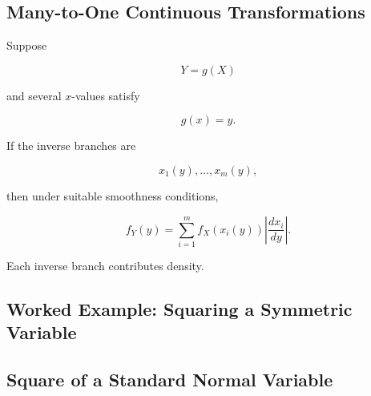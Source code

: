 \subsection{Many-to-One Continuous Transformations}
\label{subsec:many-to-one-continuous}

Suppose

\[
Y=g(X)
\]

and several \(x\)-values satisfy

\[
g(x)=y.
\]

If the inverse branches are

\[
x_1(y),\ldots,x_m(y),
\]

then under suitable smoothness conditions,

\[
\boxed{
f_Y(y)
=
\sum_{i=1}^{m}
f_X(x_i(y))
\left|
\frac{dx_i}{dy}
\right|.
}
\]

Each inverse branch contributes density.

\subsection{Worked Example: Squaring a Symmetric Variable}
\label{subsec:worked-square-continuous}


\subsection{Square of a Standard Normal Variable}
\label{subsec:square-standard-normal}

